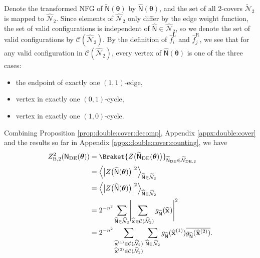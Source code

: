 \documentclass[conference]{IEEEtran}
\theoremstyle{plain}
\theoremstyle{definition}
\newcommand{\B}{\mathrm{B}}
\newcommand{\sfn}{\mathsf{N}}
\newcommand{\hatfr}[1]{\widehat{f}^{\mathrm{R}}_{ #1 }}
\newcommand{\hatfl}[1]{\widehat{f}^{\mathrm{L}}_{ #1 }}
\newcommand{\hatbfx}[1][]{\widehat{\mathbf{x}}^{ #1 }}
\newcommand{\btheta}{\boldsymbol{\theta}}
\newcommand{\sfnDE}{\sfn_{\mathrm{DE}}}
\newcommand{\validc}{\mathcal {C}(\widehat{\mathcal N}_2)}
\begin{document}
 Denote the transformed NFG of $\widetilde{\sfn}(\btheta)$ by
 $\widehat{\sfn}(\btheta)$, and the set of all $2$-covers $\widetilde{\mathcal
 N}_2$ is mapped to $\widehat{\mathcal N}_2$. Since elements of
 $\widehat{\mathcal N}_2$ only differ by the edge weight function, the set of
 valid configurations is independent of $\widehat{\sfn}\in\widehat{\mathcal
 N}_2$, so we denote the set of valid configurations by $\validc$. By the
 definition of $\hatfl{i}$ and $\hatfr{j}$, we see that for any valid
 configuration in $\validc$, every vertex of $\widehat{\sfn}(\btheta)$ is one
 of the three cases:
 \begin{itemize}
  \item the endpoint of exactly one $(1,1)$-edge,
  \item vertex in exactly one $(0,1)$-cycle,
  \item vertex in exactly one $(1,0)$-cycle.
 \end{itemize}

 Combining Proposition \ref{prop:double:cover:decomp}, Appendix
 \ref{appx:double:cover} and the results so far in Appendix
 \ref{appx:double:cover:counting}, we have
 \begin{align*}
  Z_{\B,2}^2(\sfnDE(\btheta))
   & = \Braket{Z\bigl(\widetilde{\sfn}_{\mathrm{DE}}(\btheta)\bigr)}_{\widetilde{\sfn}_{\mathrm{DE}}\in\widetilde{\mathcal N}_{\mathrm{DE},2}} \\
   & = \Big\langle\big| Z \bigl(\widetilde{\sfn}(\btheta)\bigr)\big|^2\Big\rangle_{\widetilde{\sfn}\in \widetilde {\mathcal N}_2}              \\
   & = \Big\langle\big| Z \bigl(\widehat{\sfn}(\btheta)\bigr)\big|^2\Big\rangle_{\widehat{\sfn}\in \widehat {\mathcal N}_2}                    \\
   & = 2^{-n^2}\sum_{\widehat{\sfn}\in\widehat{\mathcal N}_2}\Biggl\vert
  \sum_{\hatbfx \in \validc}
  g_{\widehat{\sfn}}(\hatbfx)\Biggr\vert^2                                                                                                     \\
   & =2^{-n^2}
  \sum_{\substack{\hatbfx[(1)]\in \validc                                                                                                      \\\hatbfx[(2)]\in \validc}} \,
  \sum_{\widehat{\sfn}\in\widehat{\mathcal N}_2}
  g_{\widehat{\sfn}}(\hatbfx[(1)])\overline{g_{\widehat{\sfn}}(\hatbfx[(2)])}.
 \end{align*}

\end{document}
